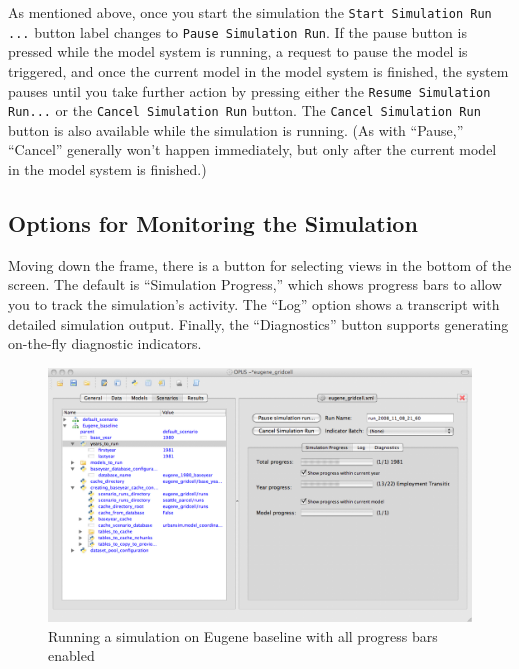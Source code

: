 As mentioned above, once you start the simulation the
\verb#Start Simulation Run ...# button label changes to
\verb#Pause Simulation Run#\@.  If the pause button is pressed while the
model system is running, a request to pause the model is triggered, and
once the current model in the model system is finished, the system pauses
until you take further action by pressing either the
\verb#Resume Simulation Run...# or the \verb#Cancel Simulation Run# button.
The \verb#Cancel Simulation Run# button is also available while the
simulation is running.  (As with ``Pause,'' ``Cancel'' generally won't
happen immediately, but only after the current model in the model system is
finished.)

\subsection{Options for Monitoring the Simulation}
\label{sec:monitoring-simulation}

Moving down the frame, there is a button for selecting views in the bottom
of the screen.  The default is ``Simulation Progress,'' which shows
progress bars to allow you to track the simulation's activity.  The ``Log''
option shows a transcript with detailed simulation output.  Finally, the
``Diagnostics'' button supports generating on-the-fly diagnostic
indicators.  

\begin{figure}[htp]
\begin{center}
\includegraphics[scale=0.4]{part-gui/images/scenario-manager-progress-bars.png}
\end{center}
\caption{Running a simulation on Eugene baseline with all progress bars
  enabled}
\label{fig:scenario-manager-progress-bars}
\end{figure}

